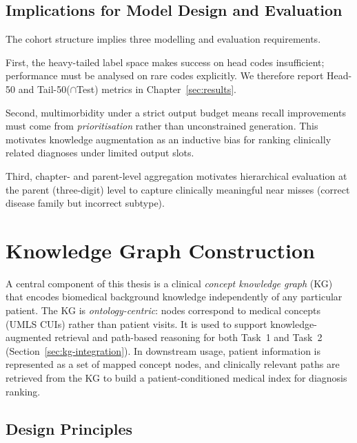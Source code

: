 \subsection{Implications for Model Design and Evaluation}
\label{subsec:implications-cohort}

The cohort structure implies three modelling and evaluation requirements.

First, the heavy-tailed label space makes success on head codes insufficient; performance must be analysed on rare codes explicitly. We therefore report Head-50 and Tail-50($\cap$Test) metrics in Chapter~\ref{sec:results}.

Second, multimorbidity under a strict output budget means recall improvements must come from \emph{prioritisation} rather than unconstrained generation. This motivates knowledge augmentation as an inductive bias for ranking clinically related diagnoses under limited output slots.

Third, chapter- and parent-level aggregation motivates hierarchical evaluation at the parent (three-digit) level to capture clinically meaningful near misses (correct disease family but incorrect subtype).


\section{Knowledge Graph Construction}
\label{subsec:kg-construction}

A central component of this thesis is a clinical \emph{concept knowledge graph} (KG) that encodes biomedical background knowledge independently of any particular patient. The KG is \emph{ontology-centric}: nodes correspond to medical concepts (UMLS CUIs) rather than patient visits. It is used to support knowledge-augmented retrieval and path-based reasoning for both Task~1 and Task~2 (Section~\ref{sec:kg-integration}). In downstream usage, patient information is represented as a set of mapped concept nodes, and clinically relevant paths are retrieved from the KG to build a patient-conditioned medical index for diagnosis ranking.

\subsection{Design Principles}
\label{subsec:kg-design}

